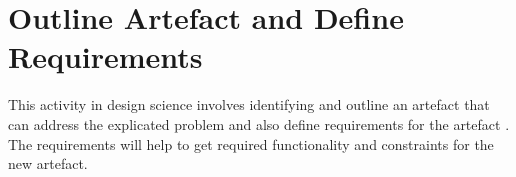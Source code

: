 \chapter{Outline Artefact and Define Requirements}
This activity in design science involves identifying and outline an artefact that can address the explicated problem and also define requirements for the artefact \cite{johannesson2012design}. The requirements will help to get required functionality and constraints for the new artefact. 

%
%


